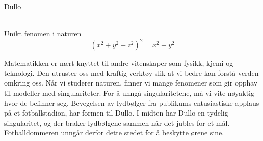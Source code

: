 \documentclass[no]{./../../common/SurferDesc}%
\begin{document}
\footnotesize


\begin{surferPage}
  \begin{surferTitle}Dullo\end{surferTitle}  
  \\
Unikt fenomen i naturen\\
\smallskip
\[(x^2+ y^2+ z^2)^2	= x^2+ y^2\]

\singlespacing
Matematikken er nært knyttet til andre vitenskaper som fysikk, kjemi og teknologi. Den utruster oss med kraftig verktøy slik at vi bedre kan forstå verden omkring oss.  
\singlespacing
Når vi studerer naturen, finner vi mange fenomener som gir opphav til modeller med singulariteter. For å unngå singularitetene, må vi vite nøyaktig hvor de befinner seg.
\singlespacing
Bevegelsen av lydbølger fra publikums entusiastiske applaus på et fotballstadion, har formen til Dullo. I midten har Dullo en tydelig singularitet, og der braker lydbølgene sammen når det jubles for et mål. Fotballdommeren unngår derfor dette stedet for å beskytte ørene sine. 


  \begin{surferText}
     \end{surferText}
\end{surferPage}
\end{document}
